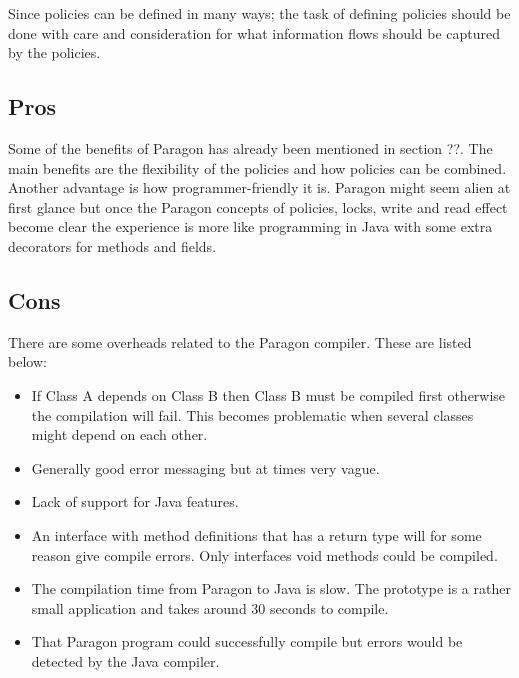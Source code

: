 Since policies can be defined in many ways; the task of defining policies should be done with care and consideration for what information flows should be captured by the policies.


\subsection{Pros}
Some of the benefits of Paragon has already been mentioned in section ??. The main benefits are the flexibility of the policies and how policies can be combined. Another advantage is how programmer-friendly it is. Paragon might seem alien at first glance but once the Paragon concepts of policies, locks, write and read effect become clear the experience is more like programming in Java with some extra decorators for methods and fields.

\subsection{Cons}
There are some overheads related to the Paragon compiler.   These are listed below:

\begin{itemize}
	\item If Class A depends on Class B then Class B must be compiled first otherwise the compilation will fail. This becomes problematic when several classes might depend on each other. 
	\item Generally good error messaging but at times very vague. 	
	\item Lack of support for Java features. 
	\item An interface with method definitions that has a return type will for some reason give compile errors. Only interfaces void methods could be compiled.
	\item The compilation time from Paragon to Java is slow. The prototype is a rather small application and takes around 30 seconds to compile.
	\item That Paragon program could successfully compile but errors would be detected by the Java compiler.
\end{itemize} 






